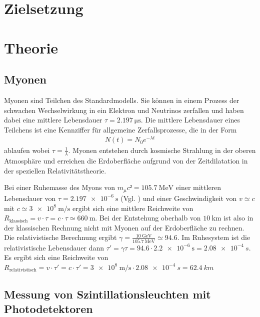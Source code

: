 \section{Zielsetzung}


\section{Theorie}
\subsection{Myonen}
Myonen sind Teilchen des Standardmodells.
Sie können in einem Prozess der schwachen Wechselwirkung in ein
Elektron und Neutrinos zerfallen und haben dabei eine mittlere Lebensdauer
$\tau = \qty{2.197}{\micro\s}$\cite{Workman:2022ynf}.
Die mittlere Lebensdauer eines Teilchens ist eine Kennziffer für
allgemeine Zerfallsprozesse, die in der Form
\begin{align}
	N(t) = N_0 e^{-\lambda t}
\end{align}
ablaufen wobei $\tau = \frac{1}{\lambda}$.
Myonen entstehen durch kosmische Strahlung in der oberen Atmosphäre
und erreichen die Erdoberfläche aufgrund von der Zeitdilatation in
der speziellen Relativitätstheorie.%

Bei einer Ruhemasse des Myons von $m_\mu c² = \qty{105.7}{\MeV}$
einer mittleren Lebensdauer von $\tau = \qty{2.197e-6}{\s}$ (Vgl. \cite{Workman:2022ynf})
und einer Geschwindigkeit von $v \simeq c$ mit $c \simeq \qty{3e8}{\meter\per\second}$ ergibt sich eine mittlere
Reichweite von $R_\text{klassisch} = v\cdot\tau = c\cdot \tau \simeq \qty{660}{\m}$. 
Bei der Entstehung oberhalb von $\qty{10}{\km}$ ist also in der klassischen Rechnung  nicht mit Myonen auf der Erdoberfläche
zu rechnen.
Die relativistische Berechnung ergibt $\gamma = \frac{\qty{10}{\GeV}}{\qty{105.7}{\MeV}} \simeq \num{94.6}$.
Im Ruhesystem ist die relativistische Lebensdauer dann $\tau' = \gamma \tau = 94.6 \cdot \qty{2.2e-6}{\s}=\qty{2.08e-4}{s} $.
Es ergibt sich eine Reichweite von $R_\text{relativistisch}= v⋅τ'=c⋅τ'=\qty{3e8}{\meter\per\second} \cdot \qty{2.08e-4}{s}=\qty{62.4}{km}$


\subsection{Messung von Szintillationsleuchten mit Photodetektoren \cite{book:kolano}}

